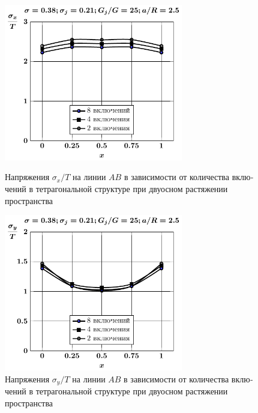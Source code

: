 \begin{russian}
\begin{figure}[h!]
\centering\footnotesize
\parbox[b]{7.5cm}{\centering\includegraphics[width=7.8cm]{inc8-4-2-a25-d95-g25-sig_x-spheres-tension2.pdf}
\caption{Напряжения $\sigma_x/T$ на линии $AB$ в зависимости от количества включений в тетрагональной структуре при двуосном растяжении пространства
\label{f:8:24}}}\hfil\hfil
\parbox[b]{7.5cm}{\centering\includegraphics[width=7.8cm]{inc8-4-2-a25-d95-g25-sig_y-spheres-tension2.pdf}
\caption{Напряжения $\sigma_y/T$ на линии $AB$ в зависимости от количества включений в тетрагональной структуре при двуосном растяжении пространства
\label{f:8:25}}}
\end{figure}

%


\end{russian}
